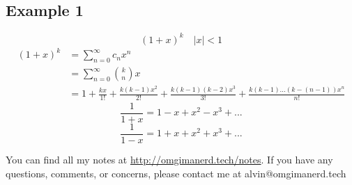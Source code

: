 \documentclass{math}
\begin{document}
\subsection*{Example 1}
\[ (1+x)^{k} \quad |x| < 1 \]
\begin{align*}
  (1+x)^{k} &= \sum_{n=0}^{\infty}c_{n}x^{n} \\
  &= \sum_{n=0}^{\infty}\binom{k}{n}x \\
  &= 1+\frac{kx}{1!}+\frac{k(k-1)x^{2}}{2!}+\frac{k(k-1)(k-2)x^{3}}{3!}
    +\frac{k(k-1)...(k-(n-1))x^{n}}{n!}
\end{align*}
\[ \frac{1}{1+x} = 1-x+x^{2}-x^{3}+... \]
\[ \frac{1}{1-x} = 1+x+x^{2}+x^{3}+... \]

\begin{center}
  You can find all my notes at \url{http://omgimanerd.tech/notes}. If you have
  any questions, comments, or concerns, please contact me at
  alvin@omgimanerd.tech
\end{center}
\end{document}
